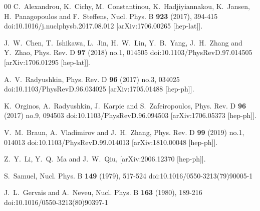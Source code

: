 \documentclass[preprint,12pt]{elsarticle}
\begin{document}
\begin{thebibliography}{00}
C.~Alexandrou, K.~Cichy, M.~Constantinou, K.~Hadjiyiannakou, K.~Jansen, H.~Panagopoulos and F.~Steffens,
Nucl. Phys. B \textbf{923} (2017), 394-415
doi:10.1016/j.nuclphysb.2017.08.012
[arXiv:1706.00265 [hep-lat]].

J.~W.~Chen, T.~Ishikawa, L.~Jin, H.~W.~Lin, Y.~B.~Yang, J.~H.~Zhang and Y.~Zhao,
Phys. Rev. D \textbf{97} (2018) no.1, 014505
doi:10.1103/PhysRevD.97.014505
[arXiv:1706.01295 [hep-lat]].

A.~V.~Radyushkin,
Phys. Rev. D \textbf{96} (2017) no.3, 034025
doi:10.1103/PhysRevD.96.034025
[arXiv:1705.01488 [hep-ph]].

K.~Orginos, A.~Radyushkin, J.~Karpie and S.~Zafeiropoulos,
Phys. Rev. D \textbf{96} (2017) no.9, 094503
doi:10.1103/PhysRevD.96.094503
[arXiv:1706.05373 [hep-ph]].

V.~M.~Braun, A.~Vladimirov and J.~H.~Zhang,
Phys. Rev. D \textbf{99} (2019) no.1, 014013
doi:10.1103/PhysRevD.99.014013
[arXiv:1810.00048 [hep-ph]].

Z.~Y.~Li, Y.~Q.~Ma and J.~W.~Qiu,
[arXiv:2006.12370 [hep-ph]].

S.~Samuel,
Nucl. Phys. B \textbf{149} (1979), 517-524
doi:10.1016/0550-3213(79)90005-1

J.~L.~Gervais and A.~Neveu,
Nucl. Phys. B \textbf{163} (1980), 189-216
doi:10.1016/0550-3213(80)90397-1


\end{thebibliography}
\end{document}
